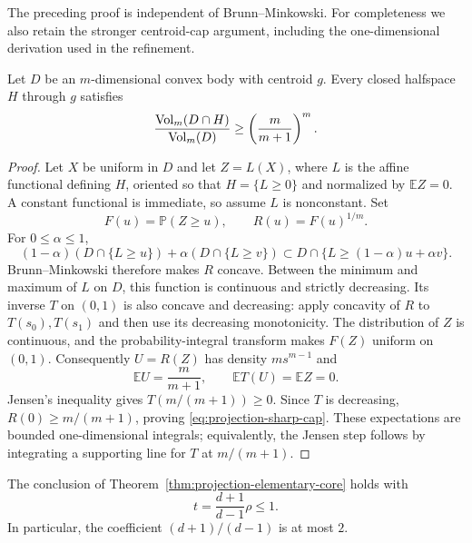 The preceding proof is independent of Brunn--Minkowski.  For completeness
we also retain the stronger centroid-cap argument, including the
one-dimensional derivation used in the refinement.

\begin{lemma}
\label{lem:projection-sharp-cap}
Let $D$ be an $m$-dimensional convex body with centroid $g$.  Every
closed halfspace $H$ through $g$ satisfies
\begin{equation}
 \frac{\operatorname{Vol}_m(D\cap H)}{\operatorname{Vol}_m(D)}
 \geq\left(\frac m{m+1}\right)^m.
 \label{eq:projection-sharp-cap}
\end{equation}
\end{lemma}

\begin{proof}
Let $X$ be uniform in $D$ and let $Z=L(X)$, where $L$ is the affine
functional defining $H$, oriented so that $H=\{L\geq0\}$ and
normalized by $\mathbb E Z=0$.  A constant functional is immediate,
so assume $L$ is nonconstant.  Set
\[
 F(u)=\mathbb P(Z\geq u),\qquad R(u)=F(u)^{1/m}.
\]
For $0\leq\alpha\leq1$,
\[
 (1-\alpha)(D\cap\{L\geq u\})+
 \alpha(D\cap\{L\geq v\})
 \subset D\cap\{L\geq(1-\alpha)u+\alpha v\}.
\]
Brunn--Minkowski therefore makes $R$ concave.  Between the minimum and
maximum of $L$ on $D$, this function is continuous and strictly
decreasing.  Its inverse $T$ on $(0,1)$ is also concave and decreasing:
apply concavity of $R$ to $T(s_0),T(s_1)$ and then use its decreasing
monotonicity.  The distribution of $Z$ is continuous, and the
probability-integral transform makes $F(Z)$ uniform on $(0,1)$.
Consequently $U=R(Z)$ has density $m s^{m-1}$ and
\[
 \mathbb E U=\frac m{m+1},\qquad
 \mathbb E T(U)=\mathbb E Z=0.
\]
Jensen's inequality gives $T(m/(m+1))\geq0$.  Since $T$ is
decreasing, $R(0)\geq m/(m+1)$, proving
\eqref{eq:projection-sharp-cap}.  These expectations are bounded
one-dimensional integrals; equivalently, the Jensen step follows by
integrating a supporting line for $T$ at $m/(m+1)$.
\end{proof}

\begin{theorem}
\label{thm:projection-sharp-core}
The conclusion of Theorem~\ref{thm:projection-elementary-core} holds
with
\begin{equation}
 t=\frac{d+1}{d-1}\rho\leq1.
 \label{eq:projection-sharp-parameter}
\end{equation}
In particular, the coefficient $(d+1)/(d-1)$ is at most $2$.
\end{theorem}

